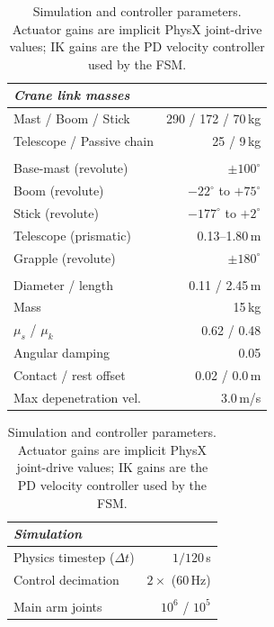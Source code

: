 \documentclass[conference]{IEEEtran}
\begin{document}
\begin{table}[t]
\centering
\caption{Simulation and controller parameters. Actuator gains are implicit PhysX joint-drive values; IK gains are the PD velocity controller used by the FSM.}
\label{tab:sim_params}
\setlength{\tabcolsep}{2pt}
\scriptsize
\begin{minipage}[t]{0.49\columnwidth}
\begin{tabular}{@{}lr@{}}
\toprule
\multicolumn{2}{l}{\textbf{\textit{Crane link masses}}} \\
\midrule
Mast / Boom / Stick & 290 / 172 / 70\,kg \\
Telescope / Passive chain & 25 / 9\,kg \\
\addlinespace[2pt]
\multicolumn{2}{l}{\textbf{\textit{Joint limits}}} \\
\midrule
Base-mast (revolute) & $\pm100^{\circ}$ \\
Boom (revolute) & $-22^{\circ}$ to $+75^{\circ}$ \\
Stick (revolute) & $-177^{\circ}$ to $+2^{\circ}$ \\
Telescope (prismatic) & 0.13--1.80\,m \\
Grapple (revolute) & $\pm180^{\circ}$ \\
\addlinespace[2pt]
\multicolumn{2}{l}{\textbf{\textit{Log properties}}} \\
\midrule
Diameter / length & 0.11 / 2.45\,m \\
Mass & 15\,kg \\
$\mu_s$ / $\mu_k$ & 0.62 / 0.48 \\
Angular damping & 0.05 \\
Contact / rest offset & 0.02 / 0.0\,m \\
Max depenetration vel. & 3.0\,m/s \\
\bottomrule
\end{tabular}
\end{minipage}%
\hfill
\begin{minipage}[t]{0.49\columnwidth}
\begin{tabular}{@{}lr@{}}
\toprule
\multicolumn{2}{l}{\textbf{\textit{Simulation}}} \\
\midrule
Physics timestep ($\Delta t$) & $1/120$\,s \\
Control decimation & $2\times$ (60\,Hz) \\
\addlinespace[2pt]
\multicolumn{2}{l}{\textbf{\textit{Actuator gains}} ($k_p$ / $k_d$)} \\
\midrule
Main arm joints & $10^{6}$ / $10^{5}$ \\

\end{tabular}
\end{minipage}
\end{table}
\end{document}
